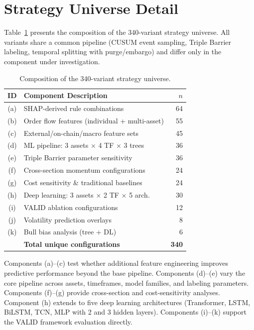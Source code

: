 \documentclass[sigconf,anonymous,review]{acmart}
\begin{document}
\section{Strategy Universe Detail}
\label{app:universe}

Table~\ref{tab:universe} presents the composition of the 340-variant
strategy universe. All variants share a common pipeline (CUSUM
event sampling, Triple Barrier labeling, temporal splitting with
purge/embargo) and differ only in the component under investigation.

\begin{table}[h]
\centering
\caption{Composition of the 340-variant strategy universe.}
\label{tab:universe}
\small
\begin{tabular}{clr}
\toprule
ID & Component Description & $n$ \\
\midrule
(a) & SHAP-derived rule combinations & 64 \\
(b) & Order flow features (individual + multi-asset) & 55 \\
(c) & External/on-chain/macro feature sets & 45 \\
(d) & ML pipeline: 3 assets $\times$ 4 TF $\times$ 3 trees & 36 \\
(e) & Triple Barrier parameter sensitivity & 36 \\
(f) & Cross-section momentum configurations & 24 \\
(g) & Cost sensitivity \& traditional baselines & 24 \\
(h) & Deep learning: 3 assets $\times$ 2 TF $\times$ 5 arch. & 30 \\
(i) & VALID ablation configurations & 12 \\
(j) & Volatility prediction overlays & 8 \\
(k) & Bull bias analysis (tree + DL) & 6 \\
\midrule
    & \textbf{Total unique configurations} & \textbf{340} \\
\bottomrule
\end{tabular}
\end{table}

Components (a)--(c) test whether additional feature engineering
improves predictive performance beyond the base pipeline.
Components (d)--(e) vary the core pipeline across assets,
timeframes, model families, and labeling parameters. Components
(f)--(g) provide cross-section and cost-sensitivity analyses.
Component (h) extends to five deep learning architectures
(Transformer, LSTM, BiLSTM, TCN, MLP with 2 and 3 hidden layers).
Components (i)--(k) support the VALID framework evaluation directly.
\end{document}
